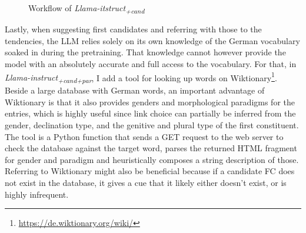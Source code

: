 \documentclass[11pt]{article}
\begin{document}
\begin{figure}[hbt!]
    \caption{Workflow of \textit{Llama-itstruct\textsubscript{+cand}}}
    \label{fig:llama-cand}
\end{figure}


Lastly, when suggesting first candidates and referring with those to the tendencies, the LLM relies solely on its own knowledge of the German vocabulary soaked in during the pretraining. That knowledge cannot however provide the model with an absolutely accurate and full access to the vocabulary. For that, in \textit{Llama-instruct\textsubscript{+cand+par}}, I add a tool for looking up words on Wiktionary\footnote{\url{https://de.wiktionary.org/wiki/}}. Beside a large database with German words, an important advantage of Wiktionary is that it also provides genders and morphological paradigms for the entries, which is highly useful since link choice can partially be inferred from the gender, declination type, and the genitive and plural type of the first constituent. The tool is a Python function that sends a GET request to the web server to check the database against the target word, parses the returned HTML fragment for gender and paradigm and heuristically composes a string description of those. Referring to Wiktionary might also be beneficial because if a candidate FC does not exist in the database, it gives a cue that it likely either doesn't exist, or is highly infrequent.
\end{document}
